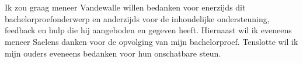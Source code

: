 
\chapter*{}
\label{ch:voorwoord}

Ik zou graag meneer Vandewalle willen bedanken voor enerzijds dit bachelorproefonderwerp en anderzijds voor de inhoudelijke ondersteuning, feedback en hulp die hij aangeboden en gegeven heeft. Hiernaast wil ik eveneens meneer Saelens danken voor de opvolging van mijn bachelorproef. Tenslotte wil ik mijn ouders eveneens bedanken voor hun onschatbare steun.

